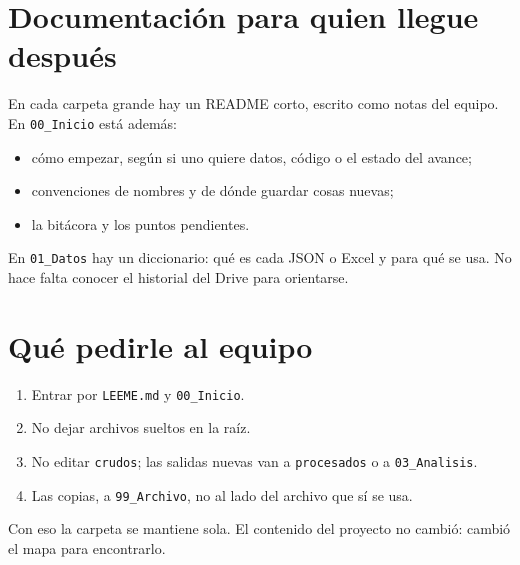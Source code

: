 \documentclass[11pt,a4paper]{article}
\begin{document}
\section{Documentación para quien llegue después}

En cada carpeta grande hay un README corto, escrito como notas del equipo. En \texttt{00\_Inicio} está además:

\begin{itemize}
  \item cómo empezar, según si uno quiere datos, código o el estado del avance;
  \item convenciones de nombres y de dónde guardar cosas nuevas;
  \item la bitácora y los puntos pendientes.
\end{itemize}

En \texttt{01\_Datos} hay un diccionario: qué es cada JSON o Excel y para qué se usa. No hace falta conocer el historial del Drive para orientarse.

\section{Qué pedirle al equipo}

\begin{enumerate}
  \item Entrar por \texttt{LEEME.md} y \texttt{00\_Inicio}.
  \item No dejar archivos sueltos en la raíz.
  \item No editar \texttt{crudos}; las salidas nuevas van a \texttt{procesados} o a \texttt{03\_Analisis}.
  \item Las copias, a \texttt{99\_Archivo}, no al lado del archivo que sí se usa.
\end{enumerate}

Con eso la carpeta se mantiene sola. El contenido del proyecto no cambió: cambió el mapa para encontrarlo.
\end{document}

